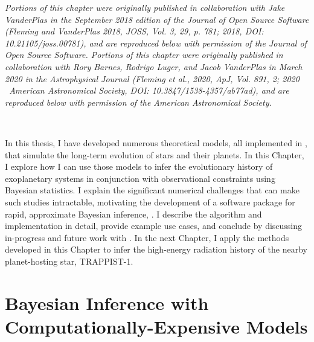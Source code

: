 \textit{Portions of this chapter were originally published in collaboration with Jake VanderPlas in the September 2018 edition of the Journal of Open Source Software (Fleming and VanderPlas 2018, JOSS, Vol. 3, 29, p. 781; 2018, DOI: 10.21105/joss.00781), and are reproduced below with permission of the Journal of Open Source Software. Portions of this chapter were originally published in collaboration with Rory Barnes, Rodrigo Luger, and Jacob VanderPlas in March 2020 in the Astrophysical Journal (Fleming et al., 2020, ApJ, Vol. 891, 2; 2020 \textcopyright \ American Astronomical Society, DOI: 10.3847/1538-4357/ab77ad), and are reproduced below with permission of the American Astronomical Society.}

\

In this thesis, I have developed numerous theoretical models, all implemented in \vplanet, that simulate the long-term evolution of stars and their planets. In this Chapter, I explore how I can use those models to infer the evolutionary history of exoplanetary systems in conjunction with observational constraints using Bayesian statistics. I explain the significant numerical challenges that can make such studies intractable, motivating the development of a software package for rapid, approximate Bayesian inference, \approxposterior \citep{FlemingVanderPlas2018}. I describe the \approxposterior algorithm and implementation in detail, provide example use cases, and conclude by discussing in-progress and future work with \approxposterior. In the next Chapter, I apply the methods developed in this Chapter to infer the high-energy radiation history of the nearby planet-hosting star, TRAPPIST-1.

\section{Bayesian Inference with Computationally-Expensive Models}

